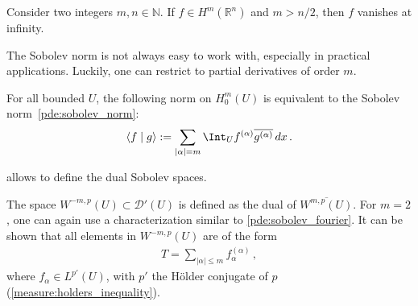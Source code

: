     \begin{property}
        Consider two integers $m,n\in\mathbb{N}$. If $f\in H^m(\mathbb{R}^n)$ and $m>n/2$, then $f$ vanishes at infinity.
    \end{property}

    The Sobolev norm is not always easy to work with, especially in practical applications. Luckily, one can restrict to partial derivatives of order $m$.
    \begin{theorem}[Friedrich]
        For all bounded $U$, the following norm on $H^m_0(U)$ is equivalent to the Sobolev norm~\eqref{pde:sobolev_norm}:
        \begin{gather}
            \langle f\mid g \rangle := \sum_{|\alpha|=m}\Int_U f^{(\alpha)}\overline{g^{(\alpha)}}\,dx\,.
        \end{gather}
    \end{theorem}

     allows to define the dual Sobolev spaces.
    \begin{definition}
        The space $W^{-m,p}(U)\subset\mathcal{D}'(U)$ is defined as the dual of $\overline{W^{m,p}(U)}$. For $m=2$, one can again use a characterization similar to \cref{pde:sobolev_fourier}. It can be shown that all elements in $W^{-m,p}(U)$ are of the form
        \begin{gather}
            T = \sum_{|\alpha|\leq m}f^{(\alpha)}_\alpha\,,
        \end{gather}
        where $f_\alpha\in L^{p'}(U)$, with $p'$ the H\"older conjugate of $p$ (\cref{measure:holders_inequality}).
    \end{definition}